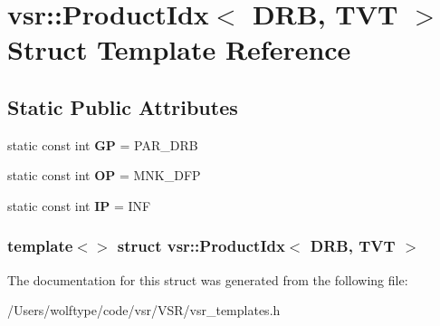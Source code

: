 \hypertarget{structvsr_1_1_product_idx_3_01_d_r_b_00_01_t_v_t_01_4}{\section{vsr\-:\-:Product\-Idx$<$ D\-R\-B, T\-V\-T $>$ Struct Template Reference}
\label{structvsr_1_1_product_idx_3_01_d_r_b_00_01_t_v_t_01_4}
}
\subsection*{Static Public Attributes}
\begin{DoxyCompactItemize}
\item 
\hypertarget{structvsr_1_1_product_idx_3_01_d_r_b_00_01_t_v_t_01_4_a1b87286fa6472250bde67ff5dbf1be77}{static const int {\bfseries G\-P} = P\-A\-R\-\_\-\-D\-R\-B}\label{structvsr_1_1_product_idx_3_01_d_r_b_00_01_t_v_t_01_4_a1b87286fa6472250bde67ff5dbf1be77}

\item 
\hypertarget{structvsr_1_1_product_idx_3_01_d_r_b_00_01_t_v_t_01_4_a827082bda19d2ca2192a0e5dd64d645e}{static const int {\bfseries O\-P} = M\-N\-K\-\_\-\-D\-F\-P}\label{structvsr_1_1_product_idx_3_01_d_r_b_00_01_t_v_t_01_4_a827082bda19d2ca2192a0e5dd64d645e}

\item 
\hypertarget{structvsr_1_1_product_idx_3_01_d_r_b_00_01_t_v_t_01_4_aabbc8285ef48225e4aa77506e78b1353}{static const int {\bfseries I\-P} = I\-N\-F}\label{structvsr_1_1_product_idx_3_01_d_r_b_00_01_t_v_t_01_4_aabbc8285ef48225e4aa77506e78b1353}

\end{DoxyCompactItemize}
\subsubsection*{template$<$$>$ struct vsr\-::\-Product\-Idx$<$ D\-R\-B, T\-V\-T $>$}



The documentation for this struct was generated from the following file\-:\begin{DoxyCompactItemize}
\item 
/\-Users/wolftype/code/vsr/\-V\-S\-R/vsr\-\_\-templates.\-h\end{DoxyCompactItemize}
